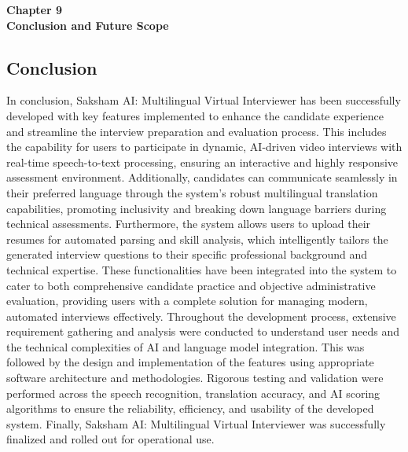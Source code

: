 \documentclass[12pt]{article}
\begin{document}
\setcounter{page}{46}

\vspace*{\fill}

\begin{center}
    {\Large \bf Chapter 9} \\[1em]
    {\Large \bf Conclusion and Future Scope}
\end{center}

\vspace*{\fill}

\newpage

\setcounter{section}{9}


\subsection{Conclusion}

In conclusion, Saksham AI: Multilingual Virtual Interviewer has been successfully developed with key features implemented to enhance the candidate experience and streamline the interview preparation and evaluation process. This includes the capability for users to participate in dynamic, AI-driven video interviews with real-time speech-to-text processing, ensuring an interactive and highly responsive assessment environment. Additionally, candidates can communicate seamlessly in their preferred language through the system's robust multilingual translation capabilities, promoting inclusivity and breaking down language barriers during technical assessments. Furthermore, the system allows users to upload their resumes for automated parsing and skill analysis, which intelligently tailors the generated interview questions to their specific professional background and technical expertise. These functionalities have been integrated into the system to cater to both comprehensive candidate practice and objective administrative evaluation, providing users with a complete solution for managing modern, automated interviews effectively. Throughout the development process, extensive requirement gathering and analysis were conducted to understand user needs and the technical complexities of AI and language model integration. This was followed by the design and implementation of the features using appropriate software architecture and methodologies. Rigorous testing and validation were performed across the speech recognition, translation accuracy, and AI scoring algorithms to ensure the reliability, efficiency, and usability of the developed system. Finally, Saksham AI: Multilingual Virtual Interviewer was successfully finalized and rolled out for operational use.
\vspace{10pt}
\end{document}

